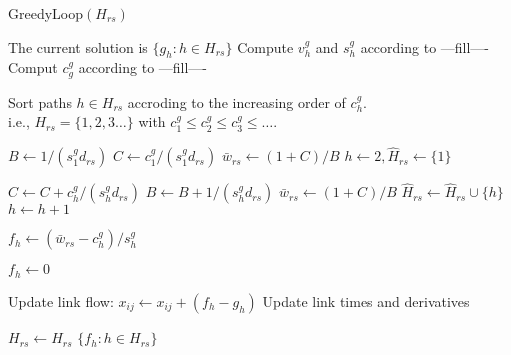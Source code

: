 \begin{algorithm}
\caption{GreedyLoop$(H_{rs})$}
\begin{algorithmic}[1]

\STATE The current solution is $\{g_h: h\in H_{rs}\}$
	\STATE Compute $v_h^g$ and $s_h^g$ according to ---fill----
	\STATE Comput $c_g^g$ according to ---fill----
\ENDFOR

\STATE Sort paths $h\in H_{rs}$ accroding to the increasing
order of $c_h^g$.\\i.e., $H_{rs} = \{1,2,3\ldots\}$ with
$c_1^g\leq c_2^g\leq c_3^g\leq \ldots$.

\STATE $B\leftarrow 1/(s_1^g d_{rs})$
\STATE $C\leftarrow c_1^g/(s_1^g d_{rs})$
\STATE $\bar{w}_{rs}\leftarrow (1+C)/B$
\STATE $h\leftarrow 2, \hat{H}_{rs}\leftarrow \{1\}$

	\STATE $C\leftarrow C + c_h^g/(s_h^g d_{rs})$
	\STATE $B\leftarrow B + 1/(s_h^g d_{rs})$
	\STATE $\bar{w}_{rs}\leftarrow (1+C)/B$
	\STATE $\hat{H}_{rs}\leftarrow \hat{H}_{rs}\cup \{h\}$
	\STATE $h\leftarrow h+1$
\ENDWHILE

	\STATE $f_h\leftarrow (\bar{w}_{rs} - c_h^g)/s_h^g$
\ENDFOR

	\STATE $f_h\leftarrow 0$
\ENDFOR

		\STATE Update link flow: $x_{ij}\leftarrow x_{ij}+(f_h-g_h)$
		\STATE Update link times and derivatives
	\ENDIF
\ENDFOR

\STATE $H_{rs}\leftarrow \hat{H}_{rs}$
\RETURN $\{f_h: h\in H_{rs}\}$
\end{algorithmic}
\end{algorithm}
